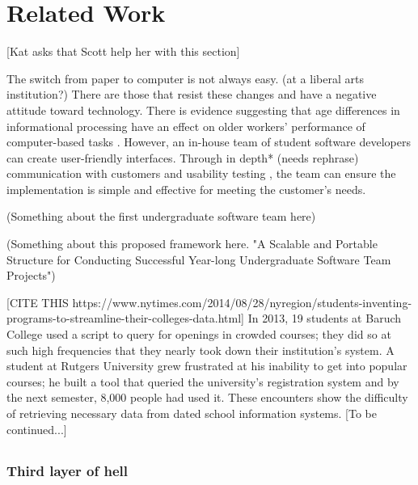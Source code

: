 \section{Related Work}
[Kat asks that Scott help her with this section]

The switch from paper to computer is not always easy. (at a liberal arts institution?) There are those that resist these changes and have a negative attitude toward technology. There is evidence suggesting that age differences in informational processing have an effect on older workers' performance of computer-based tasks \cite{oldpeopleandtech}.
However, an in-house team of student software developers can create user-friendly interfaces. Through in depth* (needs rephrase) communication with customers and usability testing \cite{usabilitytesting}, the team can ensure the implementation is simple and effective for meeting the customer's needs.

(Something about the first undergraduate software team here)\cite{rochesterfirstundergradsoftwareteam}

(Something about this proposed framework here. "A Scalable and Portable Structure for Conducting Successful Year-long Undergraduate Software Team Projects") \cite{yearlong}


[CITE THIS https://www.nytimes.com/2014/08/28/nyregion/students-inventing-programs-to-streamline-their-colleges-data.html] 
In 2013, 19 students at Baruch College used a script to query for openings in crowded courses; they did so at such high frequencies that they nearly took down their institution's system. A student at Rutgers University grew frustrated at his inability to get into popular courses; he built a tool that queried the university's registration system and by the next semester, 8,000 people had used it. These encounters show the difficulty of retrieving necessary data from dated school information systems. 
[To be continued...]
\subsection{}

\subsubsection{Third layer of hell}

\cite{heggen2018hiring}